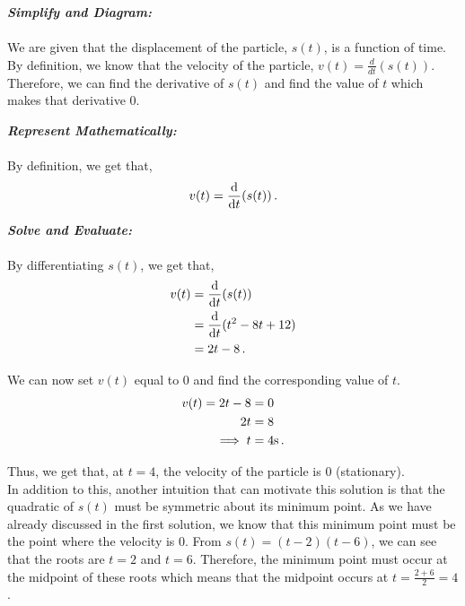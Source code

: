 \begin{subquestions}
\begin{subsubquestions}
\begin{subsubsubquestions}
			\subsubsubquestion
			
			\textbf{\textit{Simplify and Diagram:}} \\ \\
			We are given that the displacement of the particle, $s(t)$, is a function of time. By definition, we know that the velocity of the particle, $v(t)=\frac{d}{dt}(s(t))$. Therefore, we can find the derivative of $s(t)$ and find the value of $t$ which makes that derivative 0.
			
			
			
			\textbf{\textit{Represent Mathematically:}} \\ \\
			By definition, we get that,
			\begin{equation}
				v(t) = \frac{\mathrm{d}}{\mathrm{d}t}(s(t)) \,. 
			\end{equation}
		
		
		
			\textbf{\textit{Solve and Evaluate:}} \\ \\
			By differentiating $s(t)$, we get that,
			\begin{align}
				v(t) & = \frac{\mathrm{d}}{\mathrm{d}t}(s(t)) \nonumber \\
				     & = \frac{\mathrm{d}}{\mathrm{d}t}(t^2-8t+12) \nonumber \\
				     & = 2t-8 \,.
			\end{align}
			
			We can now set $v(t)$ equal to 0 and find the corresponding value of $t$.
			\begin{align}
				v(t) = 2t-8 & = 0 \nonumber \\
				       2t & = 8 \nonumber \\
				       \implies t & = 4\text{s} \,.
			\end{align}
			
			Thus, we get that, at $t=4$, the velocity of the particle is 0 (stationary). \\
			
			In addition to this, another intuition that can motivate this solution is that the quadratic of $s(t)$ must be symmetric about its minimum point. As we have already discussed in the first solution, we know that this minimum point must be the point where the velocity is 0. From $s(t)=(t-2)(t-6)$, we can see that the roots are $t=2$ and $t=6$. Therefore, the minimum point must occur at the midpoint of these roots which means that the midpoint occurs at $t=\frac{2+6}{2}=4$.
		\end{subsubsubquestions}
		

\end{subsubquestions}
\end{subquestions}
